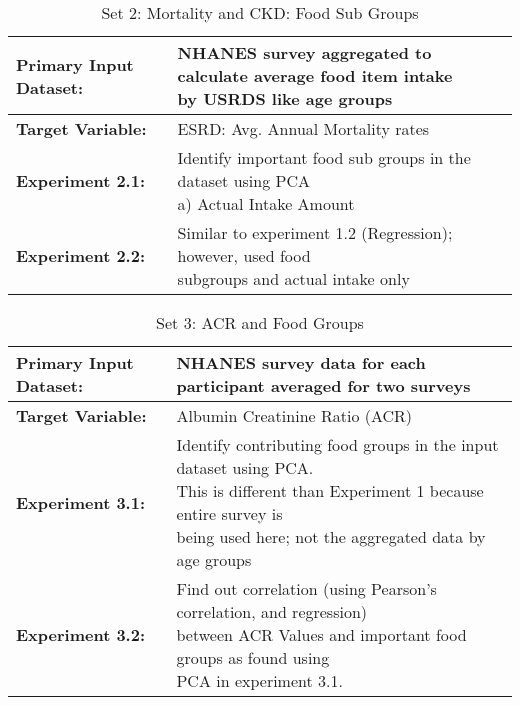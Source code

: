 \begin{center}
\begin{table}
\caption{Set 2: Mortality and CKD: Food Sub Groups}
\begin{tabular}{| l  | l | }
\hline
\noindent \textbf{Primary Input Dataset:} & \specialcell { NHANES survey aggregated to calculate average food item intake \\ by USRDS  like age groups}  \\
\hline
\noindent \textbf{Target Variable:} & ESRD: Avg. Annual Mortality rates \\
\hline
\noindent \textbf{Experiment 2.1:}  & \specialcell{Identify important food sub groups in the dataset using PCA \\ a) Actual  Intake Amount } \\
\hline
\noindent \textbf{Experiment 2.2:}  & \specialcell{Similar to experiment 1.2 (Regression); however, used food \\ subgroups  and actual intake only} \\
\hline
\end{tabular}
\end{table}
\end{center}

\begin{center}
\begin{table}
\caption{Set 3: ACR and Food Groups}
\begin{tabular}{| l  | l | }
\hline
\noindent \textbf{Primary Input Dataset:} & NHANES survey data for each participant averaged for  two surveys \\
\hline
\noindent \textbf{Target Variable:} & Albumin Creatinine Ratio (ACR) \\
\hline
\noindent \textbf{Experiment 3.1:}  & \specialcell{ Identify contributing food groups in the input dataset using PCA. \\ This is  different  than Experiment 1 because entire survey is \\ being used here; not the  aggregated  data by age groups} \\
\hline
\noindent \textbf{Experiment 3.2:}  & \specialcell{ Find out correlation (using Pearson’s correlation, and regression) \\ between ACR  Values and important food groups as found using \\ PCA in experiment 3.1.}  \\
\hline
\end{tabular}
\end{table}
\end{center}

